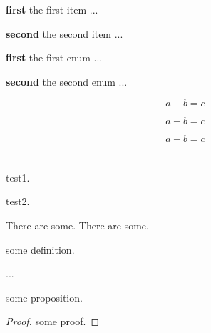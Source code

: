 \documentclass{article}
\begin{document}

\section{}
\label{sec:s1}

\begin{szxitem}
	\item\textbf{first}
	the first item ...
	 
	\item\textbf{second}
	the second item ...
\end{szxitem}

\begin{szxenum}
	\item\textbf{first}
	the first enum ...
	
	\item\textbf{second}
	the second enum ...
\end{szxenum}

\begin{equation}
\label{equ:e1}
a+b=c
\end{equation}

\begin{equation}
\label{equ:e2}
a+b=c
\end{equation}

\begin{equation}
\label{equ:e3}
a+b=c
\end{equation}

\section{}
\label{sec:s2}

test1.


test2.

There are some.
There are some.


\begin{definition}
some definition.
\label{def:sample}
\end{definition}

 ...

\begin{proposition}
some proposition.
\label{prop:sample}
\end{proposition}
\begin{proof}
some proof.
\qedhere
\end{proof}
\end{document}

